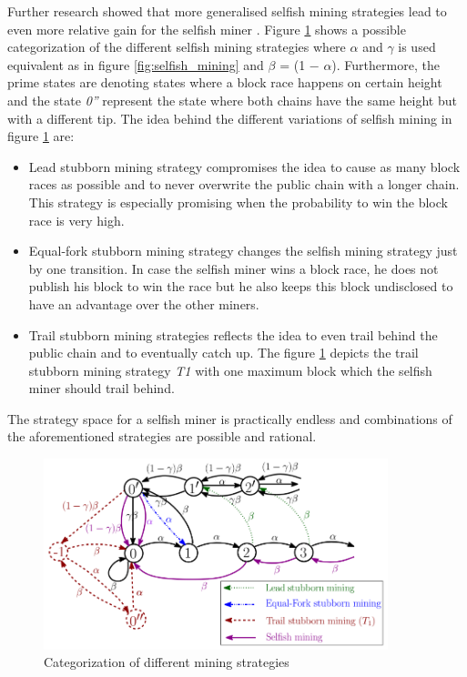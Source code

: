 \documentclass{scrartcl}
\begin{document}
Further research showed that more generalised selfish mining strategies lead to even more relative gain for the selfish miner \cite{nayak2016stubborn,sapirshtein2016optimal, gervais2015tampering, gervais2016security, bahack2013theoretical}. Figure \ref{fig:stubborn_mining} shows a possible categorization of the different selfish mining strategies where $\alpha$ and $\gamma$ is used equivalent as in figure \ref{fig:selfish_mining} and $\beta$ = (1 − $\alpha$). Furthermore, the prime states are denoting states where a block race happens on certain height and the state \textit{0''} represent the state where both chains have the same height but with a different tip. The idea behind the different variations of selfish mining in figure \ref{fig:stubborn_mining} are:
\begin{itemize}
\item Lead stubborn mining strategy compromises the idea to cause as many block races as possible and to never overwrite the public chain with a longer chain. This strategy is especially promising when the probability to win the block race is very high.
\item Equal-fork stubborn mining strategy changes the selfish mining strategy just by one transition. In case the selfish miner wins a block race, he does not publish his block to win the race but he also keeps this block undisclosed to have an advantage over the other miners.
\item Trail stubborn mining strategies reflects the idea to even trail behind the public chain and to eventually catch up. The figure \ref{fig:stubborn_mining} depicts the trail stubborn mining strategy \textit{T1} with one maximum block which the selfish miner should trail behind.
\end{itemize}

The strategy space for a selfish miner is practically endless and combinations of the aforementioned strategies are possible and rational. \cite{nayak2016stubborn,sapirshtein2016optimal, gervais2015tampering, gervais2016security, bahack2013theoretical}

\begin{figure}[t]
\includegraphics[width=10cm]{figures/stubborn_mining}
\centering
\caption{Categorization of different mining strategies \cite{nayak2016stubborn}}
\label{fig:stubborn_mining}
\end{figure}
\end{document}

